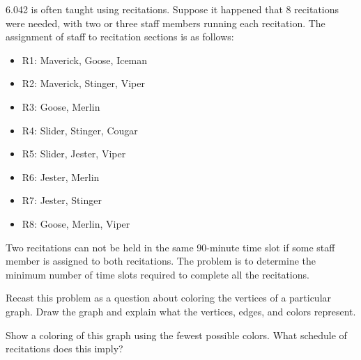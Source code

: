 \documentclass[12pt,twoside]{article}
\newcommand{\TAonename}{Maverick}
\newcommand{\TAtwoname}{Goose}
\newcommand{\TAthreename}{Iceman}
\newcommand{\TAfourname}{Jester}
\newcommand{\TAfivename}{Merlin}
\newcommand{\TAsixname}{Slider}
\newcommand{\TAsevenname}{Cougar}
\newcommand{\TAeightname}{Stinger}
\newcommand{\TAninename}{Viper}
\begin{document}
\begin{problem}{20}
6.042 is often taught using recitations.  Suppose it
happened that 8 recitations were needed, with two or three staff members
running each recitation.  The assignment of staff to recitation sections
is as follows:

\begin{itemize}
\item R1:  \TAonename, \TAtwoname, \TAthreename 
\item R2:  \TAonename, \TAeightname, \TAninename
\item R3:  \TAtwoname, \TAfivename
\item R4:  \TAsixname, \TAeightname, \TAsevenname
\item R5:  \TAsixname, \TAfourname, \TAninename
\item R6:  \TAfourname, \TAfivename
\item R7:  \TAfourname, \TAeightname
\item R8:  \TAtwoname, \TAfivename, \TAninename 
\end{itemize}

Two recitations can not be held in the same 90-minute time slot if some
staff member is assigned to both recitations.  The problem is to determine
the minimum number of time slots required to complete all the recitations.

\bparts

 Recast this problem as a question about coloring the
vertices of a particular graph.  Draw the graph and explain what the
vertices, edges, and colors represent.


Show a coloring of this graph using the fewest possible
colors.  What schedule of recitations does this imply?

\end{problem}
\end{document}
